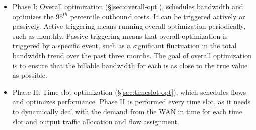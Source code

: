 \begin{itemize}
\item
Phase I: Overall optimization (\S{\ref{sec:overall-opt}}), schedules bandwidth and optimizes the $95^{th}$ percentile outbound costs. It can be triggered actively or passively. Active triggering means running overall optimization periodically, such as monthly. Passive triggering means that overall optimization is triggered by a specific event, such as a significant fluctuation in the total bandwidth trend over the past three months. The goal of overall optimization is to ensure that the billable bandwidth for each {\egress} is as close to the true value as possible.

\item 
Phase II: Time slot optimization (\S{\ref{sec:timeslot-opt}}), which schedules flows and optimizes performance. Phase II is performed every time slot, as it needs to dynamically deal with the demand from the WAN in time for each time slot and output traffic allocation and flow assignment.

\end{itemize}

